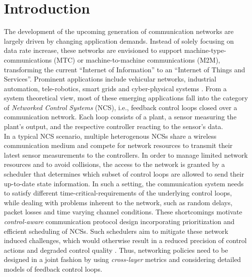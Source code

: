 \chapter{Introduction}


The development of the upcoming generation of communication networks are largely
driven by changing application demands. Instead of solely focusing on data rate
increase, these networks are envisioned to support machine-type-communications
(MTC) or machine-to-machine communications (M2M), transforming the current
``Internet of Information'' to an ``Internet of Things and Services''. Prominent
applications include vehicular networks, industrial automation, tele-robotics,
smart grids and cyber-physical systems \cite{murray2003future}. From a system
theoretical view, most of these emerging applications fall into the category of
\textit{Networked Control Systems} (NCS), i.e., feedback control loops closed
over a communication network. Each loop consists of a plant, a sensor measuring
the plant’s output, and the respective controller reacting to the sensor’s
data.
\\
In a typical NCS scenario, multiple heterogenous NCSs share a wireless
communication medium and compete for network resources to transmit their latest
sensor measurements to the controllers. In order to manage limited network
resources and to avoid collisions, the access to the network is granted by a
scheduler that determines which subset of control loops are allowed to send
their up-to-date state information. In such a setting, the communication system
needs to satisfy different time-critical-requirements of the underlying control
loops, while dealing with problems inherent to the network, such as random
delays, packet losses and time varying channel conditions. These shortcomings
motivate \textit{control-aware} communication protocol design incorporating
prioritization and efficient scheduling of NCSs. Such schedulers aim to mitigate
these network induced challenges, which would otherwise result in a reduced
precision of control actions and degraded control quality
\cite{vasconcelos2017optimal}. Thus, networking policies need to be designed in
a joint fashion by using \textit{cross-layer} metrics and considering detailed
models of feedback control loops. 

